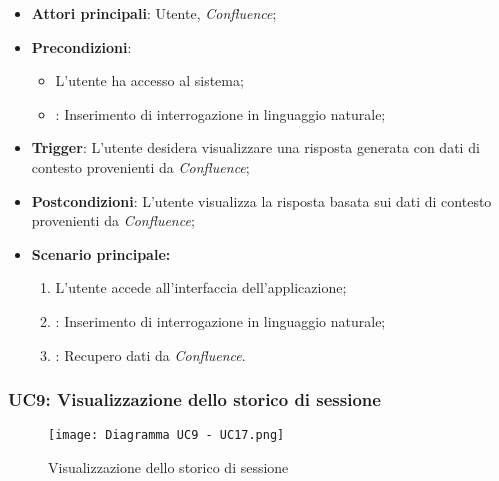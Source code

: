 \hypertarget{UC8.3}{}
\begin{itemize}
    \item \textbf{Attori principali}: Utente, \emph{Confluence};
    \item \textbf{Precondizioni}: 
    \begin{itemize}
        \item L'utente ha accesso al sistema;
        \item {}: Inserimento di interrogazione in linguaggio naturale;
    \end{itemize}
    \item \textbf{Trigger}: L'utente desidera visualizzare una risposta generata con dati di contesto provenienti da \emph{Confluence};
    \item \textbf{Postcondizioni}: L'utente visualizza la risposta basata sui dati di contesto provenienti da \emph{Confluence};
    \item \textbf{Scenario principale:}
    \begin{enumerate}
        \item L'utente accede all'interfaccia dell'applicazione;
        \item {}: Inserimento di interrogazione in linguaggio naturale;
        \item {}: Recupero dati da \emph{Confluence}.
    \end{enumerate}
\end{itemize}


\newpage
\hypertarget{UC9}{}
\subsubsection{UC9: Visualizzazione dello storico di sessione}

\begin{figure}[h]
    \centering
    \texttt{[image: Diagramma UC9 - UC17.png]}
    \caption{Visualizzazione dello storico di sessione}
\end{figure}

